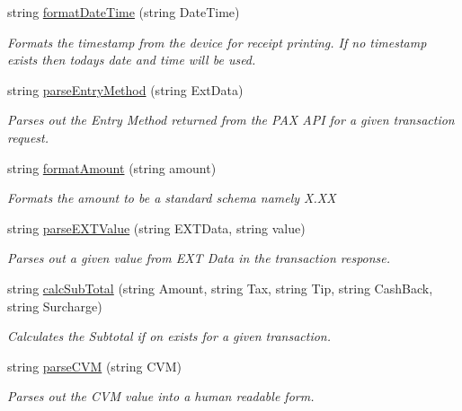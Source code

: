 \begin{DoxyCompactItemize}
string \mbox{\hyperlink{class_cert_complete_1_1_p_a_x_device_a527f014f8af57586caf64ec0af8f4eb9}{format\+Date\+Time}} (string Date\+Time)
\begin{DoxyCompactList}\small\item\em Formats the timestamp from the device for receipt printing. If no timestamp exists then todays date and time will be used. \end{DoxyCompactList}\item 
string \mbox{\hyperlink{class_cert_complete_1_1_p_a_x_device_ae4a13ce8b706ba5362cb5a32dcb53d7d}{parse\+Entry\+Method}} (string Ext\+Data)
\begin{DoxyCompactList}\small\item\em Parses out the Entry Method returned from the P\+AX A\+PI for a given transaction request. \end{DoxyCompactList}\item 
string \mbox{\hyperlink{class_cert_complete_1_1_p_a_x_device_a1abb8bb168000ff0cb11399c6c8c5f1a}{format\+Amount}} (string amount)
\begin{DoxyCompactList}\small\item\em Formats the amount to be a standard schema namely X.\+XX \end{DoxyCompactList}\item 
string \mbox{\hyperlink{class_cert_complete_1_1_p_a_x_device_aa53343951e87adb1f4e505dc39f2f571}{parse\+E\+X\+T\+Value}} (string E\+X\+T\+Data, string value)
\begin{DoxyCompactList}\small\item\em Parses out a given value from E\+XT Data in the transaction response. \end{DoxyCompactList}\item 
string \mbox{\hyperlink{class_cert_complete_1_1_p_a_x_device_a10e0f2fea2074b0dc4220b454c88c503}{calc\+Sub\+Total}} (string Amount, string Tax, string Tip, string Cash\+Back, string Surcharge)
\begin{DoxyCompactList}\small\item\em Calculates the Subtotal if on exists for a given transaction. \end{DoxyCompactList}\item 
string \mbox{\hyperlink{class_cert_complete_1_1_p_a_x_device_ad8a43be342885c17b32795363812dfb6}{parse\+C\+VM}} (string C\+VM)
\begin{DoxyCompactList}\small\item\em Parses out the C\+VM value into a human readable form. \end{DoxyCompactList}\item 

\end{DoxyCompactItemize}
